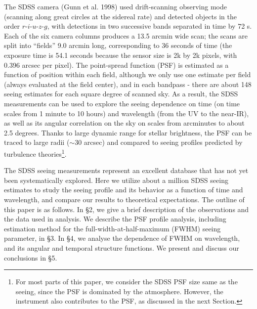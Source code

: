 The SDSS camera (Gunn et al. 1998) used drift-scanning observing mode (scanning along great circles
at the sidereal rate) and detected objects in the order 
$r$-$i$-$u$-$z$-$g$, with detections in two successive bands separated in time by 72 s. Each of the six camera
columns produces a 13.5 arcmin wide scan; the scans are split into ``fields'' 9.0 arcmin long, corresponding
to 36 seconds of time (the exposure time is 54.1 seconds because the sensor size is 2k by 2k pixels,
with 0.396 arcsec per pixel). 
The point-spread function (PSF) is estimated as a function of position
within each field, although we only use one estimate per field (always evaluated at the field center), 
and in each bandpass - there are about 
148 seeing estimates for each square degree of scanned sky. As a result, the SDSS measurements can
be used to explore the seeing dependence on time (on time scales from 1 minute to 10 hours) and 
wavelength (from the UV to the near-IR), as well as its angular correlation on the sky on scales from 
arcminutes to about 2.5 degrees. Thanks to large dynamic range for stellar brightness, the PSF can 
be traced to large radii ($\sim$30 arcsec) and compared to seeing profiles predicted by turbulence
theories\footnote{For most parts of this paper, we consider the SDSS PSF size
same as the seeing, since the PSF is dominated by the atmosphere. However,
the instrument also contributes to the PSF, as discussed in the next Section.}.

The SDSS seeing measurements represent an excellent database that has
not yet been systematically 
explored. Here we utilize about a million SDSS seeing estimates to study the seeing profile 
and its behavior as a function of time and wavelength, and compare our results to theoretical 
expectations. The outline of this paper is as follows. In \S2, we give a brief description of the 
observations and the data used in analysis. We describe the PSF profile analysis, 
including estimation method for the full-width-at-half-maximum (FWHM) seeing
parameter, in \S3. In \S4, we analyse the dependence of FWHM on wavelength, and its angular 
and temporal structure functions. We present and discuss our conclusions in \S5. 